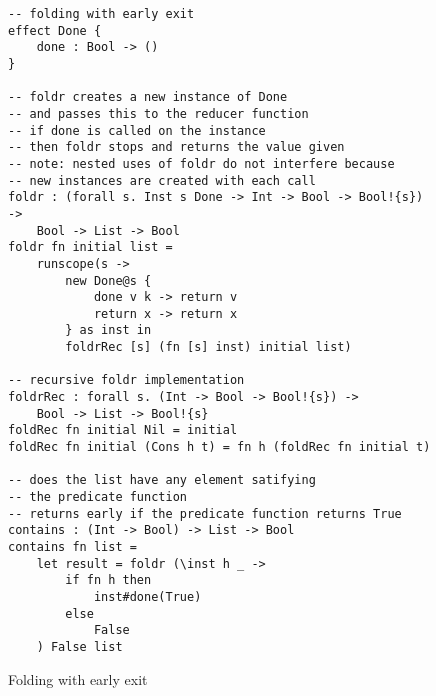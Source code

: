 \begin{figure}[h]
\caption{Folding with early exit}
\begin{verbatim}
-- folding with early exit
effect Done {
	done : Bool -> ()
}

-- foldr creates a new instance of Done
-- and passes this to the reducer function
-- if done is called on the instance
-- then foldr stops and returns the value given
-- note: nested uses of foldr do not interfere because
-- new instances are created with each call
foldr : (forall s. Inst s Done -> Int -> Bool -> Bool!{s}) ->
	Bool -> List -> Bool
foldr fn initial list =
	runscope(s ->
		new Done@s {
			done v k -> return v
			return x -> return x
		} as inst in
		foldrRec [s] (fn [s] inst) initial list)

-- recursive foldr implementation
foldrRec : forall s. (Int -> Bool -> Bool!{s}) ->
	Bool -> List -> Bool!{s}
foldRec fn initial Nil = initial
foldRec fn initial (Cons h t) = fn h (foldRec fn initial t)

-- does the list have any element satifying
-- the predicate function
-- returns early if the predicate function returns True
contains : (Int -> Bool) -> List -> Bool
contains fn list =
	let result = foldr (\inst h _ ->
		if fn h then
			inst#done(True)
		else
			False
	) False list
\end{verbatim}
\label{fig:localeffects}
\end{figure}
